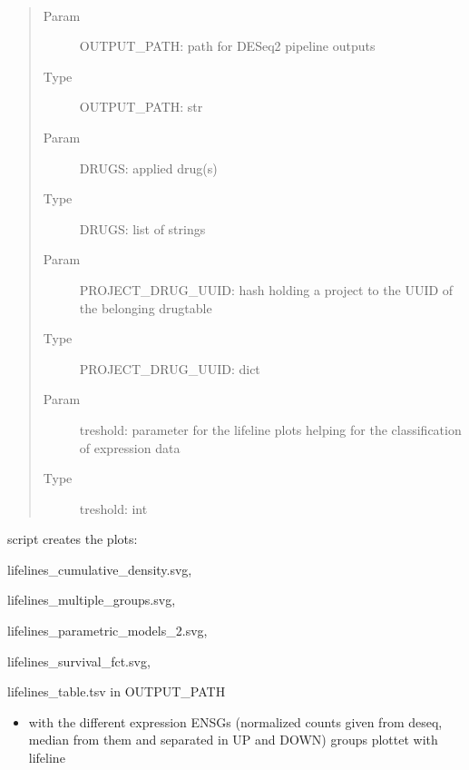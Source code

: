 \documentclass[letterpaper,10pt,english]{sphinxmanual}
\begin{document}
\begin{fulllineitems}
\label{\detokenize{index:lifeline_summary_test_2.lifelines_ENSG}}~\begin{quote}\begin{description}
\item[{Param}] \leavevmode
\sphinxAtStartPar
OUTPUT\_PATH: path for DESeq2 pipeline outputs

\item[{Type}] \leavevmode
\sphinxAtStartPar
OUTPUT\_PATH: str

\item[{Param}] \leavevmode
\sphinxAtStartPar
DRUGS: applied drug(s)

\item[{Type}] \leavevmode
\sphinxAtStartPar
DRUGS: list of strings

\item[{Param}] \leavevmode
\sphinxAtStartPar
PROJECT\_DRUG\_UUID: hash holding a project to the UUID of the    belonging drugtable

\item[{Type}] \leavevmode
\sphinxAtStartPar
PROJECT\_DRUG\_UUID: dict

\item[{Param}] \leavevmode
\sphinxAtStartPar
treshold: parameter for the lifeline plots helping for the    classification of expression data

\item[{Type}] \leavevmode
\sphinxAtStartPar
treshold: int

\end{description}\end{quote}

\begin{DUlineblock}{0em}
\item[] script creates the plots:
\item[] lifelines\_cumulative\_density.svg,
\item[] lifelines\_multiple\_groups.svg,
\item[] lifelines\_parametric\_models\_2.svg,
\item[] lifelines\_survival\_fct.svg,
\item[] lifelines\_table.tsv in OUTPUT\_PATH
\end{DUlineblock}
\begin{itemize}
\item {} 
\sphinxAtStartPar
with the different expression ENSGs (normalized counts given from        deseq, median from them and separated in UP and DOWN)         groups plottet with lifeline


\end{itemize}
\end{fulllineitems}
\end{document}
